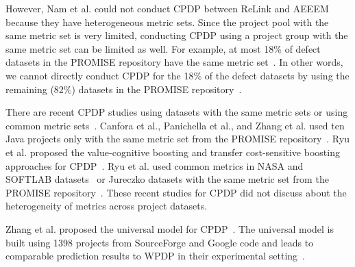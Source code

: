 However, Nam et al. could not conduct CPDP between ReLink and AEEEM because they
have heterogeneous metric sets.
Since the project pool with the same metric set is very limited, conducting
CPDP using a project group with the same metric set can be
limited as well. For example, at most 18\% of defect datasets in the
PROMISE repository have the same metric set~\cite{promise12}. In other words,
we cannot directly conduct CPDP for the 18\% of the defect datasets by
using the remaining (82\%) datasets in the PROMISE
repository~\cite{promise12}.


There are recent CPDP studies using datasets with the same metric sets or using common metric sets~\cite{Canfora13,promise12,Panichella14,Zhang15,Ryu14,Ryu15}.
Canfora et al., Panichella et al., and Zhang et al.
used ten Java projects only with the same metric set from the PROMISE
repository~\cite{Canfora13,promise12,Panichella14,Zhang15}.
Ryu et al. proposed the value-cognitive boosting and transfer cost-sensitive boosting approaches for CPDP~\cite{Ryu14,Ryu15}. Ryu et al. used common metrics in NASA and SOFTLAB datasets~\cite{Ryu14} or Jureczko datasets with the same metric set from the PROMISE repository~\cite{Ryu15}. These recent studies for CPDP did not discuss about the heterogeneity of metrics across project datasets.




Zhang et al. proposed the universal model for CPDP~\cite{Zhang14}.
The universal model is
built using 1398 projects from SourceForge and Google code and leads to
comparable prediction results to WPDP in their experimental
setting~\cite{Zhang14}.

